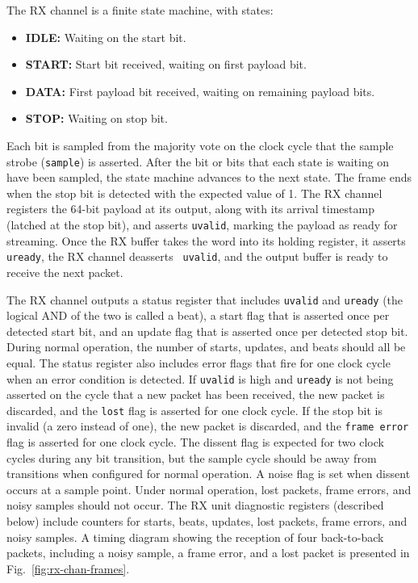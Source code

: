 \documentclass[12pt]{article}
\begin{document}
The RX channel is a finite state machine, with states:
\begin{itemize}
  \item {\bf IDLE:} Waiting on the start bit.
  \item {\bf START:} Start bit received, waiting on first payload bit.
  \item {\bf DATA:} First payload bit received, waiting on remaining payload bits.
  \item {\bf STOP:} Waiting on stop bit.
\end{itemize}
Each bit is sampled from the majority vote on the clock cycle that the
sample strobe ({\tt sample}) is asserted. After the bit or bits that
each state is waiting on have been sampled, the state machine advances
to the next state.  The frame ends when the stop bit is detected with
the expected value of 1.  The RX channel registers the 64-bit payload
at its output, along with its arrival timestamp (latched at the stop
bit), and asserts {\tt uvalid}, marking the payload as ready for
streaming.  Once the RX buffer takes the word into its holding
register, it asserts {\tt uready}, the RX channel deasserts {\tt
  uvalid}, and the output buffer is ready to receive the next packet.

The RX channel outputs a status register that includes {\tt uvalid}
and {\tt uready} (the logical AND of the two is called a beat), a start
flag that is asserted once per detected start bit, and an update flag
that is asserted once per detected stop bit.  During normal operation,
the number of starts, updates, and beats should all be equal.  The
status register also includes error flags that fire for one clock
cycle when an error condition is detected.  If {\tt uvalid} is high
and {\tt uready} is not being asserted on the cycle that a new packet
has been received, the new packet is discarded, and the {\tt lost}
flag is asserted for one clock cycle.  If the stop bit is invalid (a
zero instead of one), the new packet is discarded, and the {\tt frame
  error} flag is asserted for one clock cycle.  The dissent flag is
expected for two clock cycles during any bit transition, but the
sample cycle should be away from transitions when configured for
normal operation.  A noise flag is set when dissent occurs at a sample
point.  Under normal operation, lost packets, frame errors, and noisy
samples should not occur.  The RX unit diagnostic registers (described
below) include counters for starts, beats, updates, lost packets, frame
errors, and noisy samples.  A timing diagram showing the reception of four
back-to-back packets, including a noisy sample, a frame error, and a
lost packet is presented in Fig.~\ref{fig:rx-chan-frames}.
\end{document}
